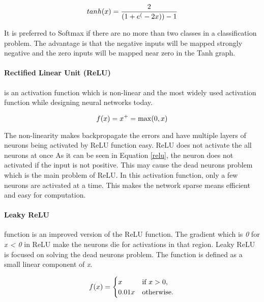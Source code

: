             \begin{equation}
                tanh(x) = \frac{2}{(1+e^(-2x)) -1} \label{tanh} \\
            \end{equation}

            It is preferred to Softmax if there are no more than two classes in a classification problem.
            The advantage is that the negative inputs will be mapped strongly negative and the zero inputs will be mapped near zero in the Tanh graph.

        \paragraph{Rectified Linear Unit (ReLU)}is an activation function which is non-linear and the most widely used activation function while designing neural networks today.

            \begin{equation}
                  f(x) = x^+ = \max(0, x) \label{relu} \\
            \end{equation}

            The non-linearity makes backpropagate the errors and have multiple layers of neurons being activated by ReLU function easy.
            ReLU does not activate the all neurons at once
            As it can be seen in Equation \eqref{relu}, the neuron does not activated if the input is not positive.
            This may cause the dead neurons problem which is the main problem of ReLU.
            In this activation function, only a few neurons are activated at a time. This makes the network sparse means efficient and easy for computation.

        \paragraph{Leaky ReLU} function is an improved version of the ReLU function.
            The gradient which is \emph{0} for \emph{x < 0} in ReLU make the neurons die for activations in that region.
            Leaky ReLU is focused on solving the dead neurons problem.
            The function is defined as a small linear component of \emph{x}.

            \begin{equation}
                 f(x) = \begin{cases} x &
                    \text{if } x > 0, \\
                    0.01x & \text{otherwise}.
                 \end{cases}\\
            \end{equation}

